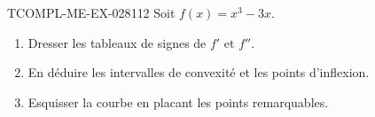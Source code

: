 \begin{exercice}{TCOMPL-ME-EX-028}{1}{12}
Soit $f(x) = x^3 - 3x$.
\begin{enumerate}
  \item Dresser les tableaux de signes de $f'$ et $f''$.
  \item En déduire les intervalles de convexité et les points d'inflexion.
  \item Esquisser la courbe en placant les points remarquables.
\end{enumerate}

\end{exercice}
